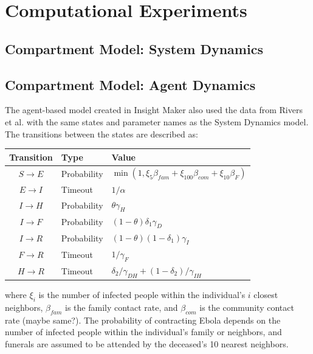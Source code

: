 \documentclass[10pt]{article}
\begin{document}
\section{Computational Experiments}

\subsection{Compartment Model: System Dynamics}

\subsection{Compartment Model: Agent Dynamics}
The agent-based model created in Insight Maker also used the data from Rivers et al. with the same states and parameter names as the System Dynamics model. The transitions between the states are described as:\\

\begin{table}[ht]
\begin{center}
\begin{tabular}{c | l | l}
{\bf Transition} & {\bf Type } & {\bf Value}\\\hline
$S\rightarrow E$ & Probability & $\min(1,\xi_5\beta_{fam}+\xi_{100}\beta_{com}+\xi_{10}\beta_F)$\\
$E\rightarrow I$ & Timeout & $1/\alpha$\\
$I\rightarrow H$ & Probability & $\theta\gamma_H$\\
$I\rightarrow F$ & Probability & $(1-\theta)\delta_1\gamma_D$\\
$I\rightarrow R$ & Probability & $(1-\theta)(1-\delta_{1})\gamma_I$\\
$F\rightarrow R$ & Timeout & ${1}/{\gamma_{F}}$\\
$H\rightarrow R$ & Timeout & $\delta_{2}/{\gamma_{DH}} + (1-\delta_{2})/{\gamma_{IH}}$\\
\end{tabular}
\end{center}
\end{table}
\noindent where $\xi_{i}$ is the number of infected people within the individual's $i$ closest neighbors, $\beta_{fam}$ is the family contact rate, and $\beta_{com}$ is the community contact rate (maybe same?). The probability of contracting Ebola depends on the number of infected people within the individual's family or neighbors, and funerals are assumed to be attended by the deceased's 10 nearest neighbors.
\end{document}
